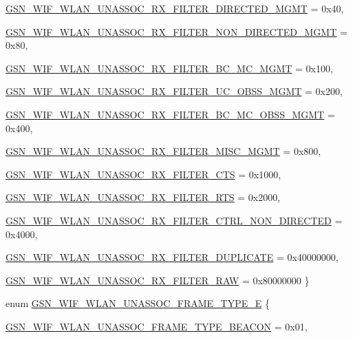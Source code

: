 \begin{DoxyCompactItemize}
\par
\hyperlink{a00677_gaca8dae165f1024726492234d64d1bb26af8775826813c36b8c1598ae6879cfba0}{GSN\_\-WIF\_\-WLAN\_\-UNASSOC\_\-RX\_\-FILTER\_\-DIRECTED\_\-MGMT} =  0x40, 
\par
\hyperlink{a00677_gaca8dae165f1024726492234d64d1bb26af317c471e0b75c590a52ab43b240c9ab}{GSN\_\-WIF\_\-WLAN\_\-UNASSOC\_\-RX\_\-FILTER\_\-NON\_\-DIRECTED\_\-MGMT} =  0x80, 
\par
\hyperlink{a00677_gaca8dae165f1024726492234d64d1bb26a1fececaa8e82e17ef671ac741ede8145}{GSN\_\-WIF\_\-WLAN\_\-UNASSOC\_\-RX\_\-FILTER\_\-BC\_\-MC\_\-MGMT} =  0x100, 
\par
\hyperlink{a00677_gaca8dae165f1024726492234d64d1bb26ace06f12ab143951f3076cfda0d554341}{GSN\_\-WIF\_\-WLAN\_\-UNASSOC\_\-RX\_\-FILTER\_\-UC\_\-OBSS\_\-MGMT} =  0x200, 
\par
\hyperlink{a00677_gaca8dae165f1024726492234d64d1bb26a5814545b64e9edfc82e6cce14fac088e}{GSN\_\-WIF\_\-WLAN\_\-UNASSOC\_\-RX\_\-FILTER\_\-BC\_\-MC\_\-OBSS\_\-MGMT} =  0x400, 
\par
\hyperlink{a00677_gaca8dae165f1024726492234d64d1bb26a658f0029149502ff6d88746d1155a062}{GSN\_\-WIF\_\-WLAN\_\-UNASSOC\_\-RX\_\-FILTER\_\-MISC\_\-MGMT} =  0x800, 
\par
\hyperlink{a00677_gaca8dae165f1024726492234d64d1bb26ae2133c9d5f0e354b2c1f5a183f6129ba}{GSN\_\-WIF\_\-WLAN\_\-UNASSOC\_\-RX\_\-FILTER\_\-CTS} =  0x1000, 
\par
\hyperlink{a00677_gaca8dae165f1024726492234d64d1bb26aec9ffc7f5bbdc50dca13a4382ebc1a81}{GSN\_\-WIF\_\-WLAN\_\-UNASSOC\_\-RX\_\-FILTER\_\-RTS} =  0x2000, 
\par
\hyperlink{a00677_gaca8dae165f1024726492234d64d1bb26a3ea1089bab7a8123f711759e4b661d9c}{GSN\_\-WIF\_\-WLAN\_\-UNASSOC\_\-RX\_\-FILTER\_\-CTRL\_\-NON\_\-DIRECTED} =  0x4000, 
\par
\hyperlink{a00677_gaca8dae165f1024726492234d64d1bb26af4182fe03c8de0039a5d969b5cae2b42}{GSN\_\-WIF\_\-WLAN\_\-UNASSOC\_\-RX\_\-FILTER\_\-DUPLICATE} = 0x40000000, 
\par
\hyperlink{a00677_gaca8dae165f1024726492234d64d1bb26ac5a49e97e8e97f7b2f944afa1e32e4a7}{GSN\_\-WIF\_\-WLAN\_\-UNASSOC\_\-RX\_\-FILTER\_\-RAW} = 0x80000000
 \}
\item 
enum \hyperlink{a00677_ga1b471d184450287e7d0cec7c8d0c4639}{GSN\_\-WIF\_\-WLAN\_\-UNASSOC\_\-FRAME\_\-TYPE\_\-E} \{ \par
\hyperlink{a00677_ga1b471d184450287e7d0cec7c8d0c4639aab34b890bb27dc08cb9c1b0f33ea7564}{GSN\_\-WIF\_\-WLAN\_\-UNASSOC\_\-FRAME\_\-TYPE\_\-BEACON} =  0x01, 

\end{DoxyCompactItemize}
